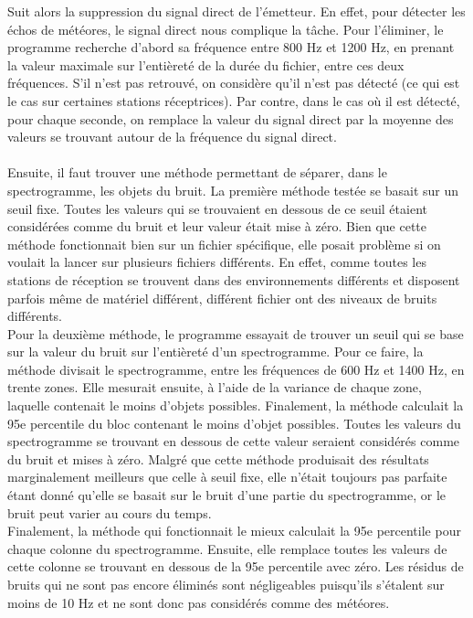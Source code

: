 \documentclass[11pt]{article}
\begin{document}
Suit alors la suppression du signal direct de l'émetteur.
En effet, pour détecter les échos de météores, le signal direct nous complique la tâche.
Pour l'éliminer, le programme recherche d'abord sa fréquence entre 800 Hz et 1200 Hz, en prenant la valeur maximale sur l'entièreté de la durée du fichier, entre ces deux fréquences.
S'il n'est pas retrouvé, on considère qu'il n'est pas détecté (ce qui est le cas sur certaines stations réceptrices).
Par contre, dans le cas où il est détecté, pour chaque seconde, on remplace la valeur du signal direct par la moyenne des valeurs se trouvant autour de la fréquence du signal direct.\\
\\
Ensuite, il faut trouver une méthode permettant de séparer, dans le spectrogramme, les objets du bruit.
La première méthode testée se basait sur un seuil fixe.
Toutes les valeurs qui se trouvaient en dessous de ce seuil étaient considérées comme du bruit et leur valeur était mise à zéro.
Bien que cette méthode fonctionnait bien sur un fichier spécifique, elle posait problème si on voulait la lancer sur plusieurs fichiers différents.
En effet, comme toutes les stations de réception se trouvent dans des environnements différents et disposent parfois même de matériel différent, différent fichier ont des niveaux de bruits différents.\\
Pour la deuxième méthode, le programme essayait de trouver un seuil qui se base sur la valeur du bruit sur l'entièreté d'un spectrogramme.
Pour ce faire, la méthode divisait le spectrogramme, entre les fréquences de 600 Hz et 1400 Hz, en trente zones.
Elle mesurait ensuite, à l'aide de la variance de chaque zone, laquelle contenait le moins d'objets possibles.
Finalement, la méthode calculait la 95e percentile du bloc contenant le moins d'objet possibles.
Toutes les valeurs du spectrogramme se trouvant en dessous de cette valeur seraient considérés comme du bruit et mises à zéro.
Malgré que cette méthode produisait des résultats marginalement meilleurs que celle à seuil fixe, elle n'était toujours pas parfaite étant donné qu'elle se basait sur le bruit d'une partie du spectrogramme, or le bruit peut varier au cours du temps.\\
Finalement, la méthode qui fonctionnait le mieux calculait la 95e percentile pour chaque colonne du spectrogramme.
Ensuite,  elle remplace toutes les valeurs de cette colonne se trouvant en dessous de la 95e percentile avec zéro.
Les résidus de bruits qui ne sont pas encore éliminés sont négligeables puisqu'ils s'étalent sur moins de 10 Hz et ne sont donc pas considérés comme des météores.\\
\end{document}
